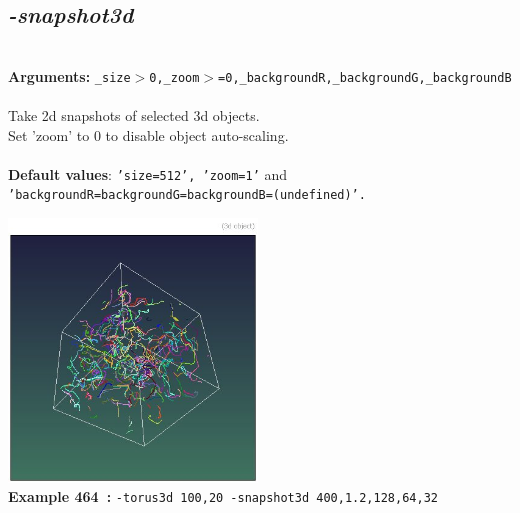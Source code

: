 \documentclass[a4paper,11pt,twoside]{book}
\begin{document}
\subsection{\emph{-snapshot3d} }\vspace*{-0.5em}
~\\\textbf{Arguments: } 
{\small \texttt{\_size$>$0,\_zoom$>$=0,\_backgroundR,\_backgroundG,\_backgroundB}}\\~\\
Take 2d snapshots of selected 3d objects.
~\\Set 'zoom' to 0 to disable object auto-scaling.
~\\~\\\textbf{Default values}: {\small \texttt{'size=512', 'zoom=1'} and \texttt{'backgroundR=backgroundG=backgroundB=(undefined)'.}}
\begin{center}\includegraphics[keepaspectratio=true,height=7cm,width=\textwidth]{img/gmic_def464.jpg}\\
{\footnotesize \textbf{Example 464~:} \texttt{-torus3d 100,20 -snapshot3d 400,1.2,128,64,32}}
\end{center}
\end{document}
